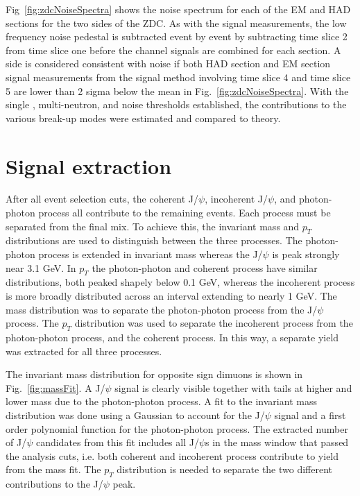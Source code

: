      Fig~\ref{fig:zdcNoiseSpectra} shows the noise spectrum for each of the 
        EM and HAD sections for the two sides of the ZDC. 
      As with the signal measurements, the low frequency noise pedestal is 
        subtracted event by event by subtracting time slice 2 from time slice
        one before the channel signals are combined for each section.
      A side is considered consistent with noise if both HAD section and EM 
        section signal measurements from the signal method involving time slice
        4 and time slice 5 are lower than 2 sigma below the mean in 
        Fig.~\ref{fig:zdcNoiseSpectra}.
      With the single \DIFdelbegin {}\DIFdelend \DIFaddbegin {}\DIFaddend , multi-neutron, and noise thresholds established,
        the contributions to the various break-up modes were estimated and 
        compared to theory. 


  \section{\label{sec:sigEx} Signal extraction}
    After all event selection cuts, the coherent J/$\psi$, incoherent J/$\psi$,
      and photon-photon process all contribute to the remaining events.
    Each process must be separated from the final mix.
    To achieve this, the invariant mass and $p_{T}$ distributions are used 
      to distinguish between the three processes. 
    The photon-photon process is extended in invariant mass whereas the 
      J/$\psi$ is peak strongly near 3.1 GeV.
    In $p_{T}$ the photon-photon and coherent process have similar 
      distributions, both peaked shapely below 0.1 GeV, whereas the incoherent 
      process is more broadly distributed across an interval extending to 
      nearly 1 GeV.
    The mass distribution was \DIFdelbegin {}\DIFdelend \DIFaddbegin {}\DIFaddend to separate the photon-photon process from
      the J/$\psi$ process.
    The $p_{T}$ distribution was used to separate the incoherent process from 
      the photon-photon process, and the coherent process. 
    In this way, a separate yield was extracted for all three processes. 

    The invariant mass distribution for opposite sign dimuons is shown in 
      Fig.~\ref{fig:massFit}. 
    A J/$\psi$ signal is clearly visible together with tails at higher and
      \DIFdelbegin {}\DIFdelend lower mass due to the photon-photon process.
    A fit to the invariant mass distribution was done using a Gaussian
      to account for the J/$\psi$ signal and a first order polynomial function 
      for the photon-photon process.
    The extracted number of J/$\psi$ candidates from this fit includes all 
      J/$\psi$s in the mass window that passed the analysis cuts, i.e. both
      coherent and incoherent process contribute to yield from the mass
      fit.
    The $p_{T}$ distribution is needed to separate the two different 
      contributions to the J/$\psi$ peak. 

